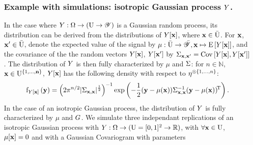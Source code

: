 \subsubsection*{Example with simulations: isotropic Gaussian process $Y$.}
In the case where $Y:\Omega\to(\mathrm{U}\to\mathscr{Y})$ is a Gaussian random process, its distribution  can be derived from the distributions of $Y[\mathbf{x}]$, where $\mathbf{x}\in\bar{\mathrm{U}}$. 
For $\mathbf{x}$, $\mathbf{x}'\in\bar{\mathrm{U}}$, denote the expected value of the signal by $\mu:\bar{\mathrm{U}}\to\bar{\mathscr{Y}},\mathbf{x}\mapsto\mathrm{E}\left[Y[\mathbf{x}]\right]$, and the covariance of the the random vectors $Y[\mathbf{x}]$, $Y[\mathbf{x}']$  by $\Sigma_{\mathbf{x},\mathbf{x}'}=\mathrm{Cov} \left[Y[\mathbf{x}],Y[\mathbf{x}']\right]$.
The distribution of $Y$ is then fully characterized by $\mu$ and $\Sigma$: for $n\in\mathbb{N}$,   $\mathbf{x}\in\mathrm{U}^{\{1,\ldots,\mathbf{n}\}}$, $Y[\mathbf{x}]$ has the following density with respect to $\eta^{\otimes \{1,\ldots,n\}}$: 
\begin{equation} \label{eq:pdf_norm_process}
    \mathrm{f}_{Y[\mathbf{x}]}\left(\mathbf{y}\right)=\left(2\pi^{n/2}|\Sigma_{\mathbf{x},\mathbf{x}}|^{\frac12}\right)^{-1}\exp\left(-\frac12(\mathbf{y}-\mu(\mathbf{x}))\Sigma_{\mathbf{x},\mathbf{x}}^{-1}(\mathbf{y}-\mu(\mathbf{x}))^{\!\mathrm{T}}\right).
\end{equation}
In the case of an isotropic Gaussian process, the 
distribution of $Y$ is fully characterized by $\mu$ and $G$.
%
We simulate three independant replications of an isotropic Gaussian process with $Y:\Omega\to(\mathrm{U}=[0,1]^2\to\mathbb{R})$, with $\forall \mathbf{x}\in\mathrm{U}$, $\mathrm{\mu}[\mathbf{x}]=0$ and with a Gaussian Covariogram with parameters
